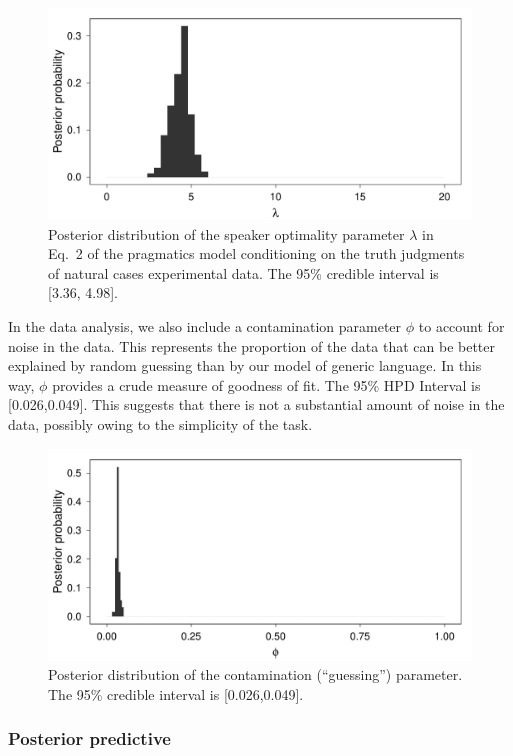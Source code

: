 \documentclass[10pt,letterpaper]{article}
\begin{document}
\begin{figure}
\centering
    \includegraphics[width=0.8\columnwidth]{naturalGenerics-speakerOptimality.pdf}
    \caption{Posterior distribution of the speaker optimality parameter $\lambda$ in Eq.~2 of the pragmatics model conditioning on the truth judgments of natural cases experimental data. The 95\% credible interval is [3.36, 4.98].}
  \label{fig:lambda1}
\end{figure}

In the data analysis, we also include a contamination parameter $\phi$ to account for noise in the data.  
This represents the proportion of the data that can be better explained by random guessing than by our model of generic language.
In this way, $\phi$ provides a crude measure of goodness of fit. 
The 95\% HPD Interval is [0.026,0.049]. 
This suggests that there is not a substantial amount of noise in the data, possibly owing to the simplicity of the task. 

\begin{figure}
\centering
    \includegraphics[width=0.8\columnwidth]{naturalGenerics-phi.pdf}
    \caption{Posterior distribution of the contamination (``guessing'') parameter. The 95\% credible interval is [0.026,0.049].}
  \label{fig:phi1}
\end{figure}



\subsubsection{Posterior predictive}
\end{document}
